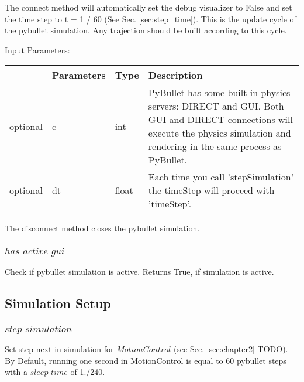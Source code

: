 \documentclass[
	ngerman,
	accentcolor=9c,%
	type=intern,
	marginpar=false
	]{tudapub}
\begin{document}
\vspace{0.5cm}

\noindent The connect method will automatically set the debug visualizer to False and set the time step to  t = 1 / 60 (See Sec. \ref{sec:step_time}). This is the update cycle of the pybullet simulation. Any trajection should be built according to this cycle. 


\vspace{0.5cm}
\noindent Input Parameters:
\vspace{0.5cm}


\begin{tabular}{|p{}|p{}|p{}| p{}|}
\hline
 & \textbf{Parameters} & \textbf{Type} & \textbf{Description} \\
\hline
optional & c & int &  PyBullet has some built-in physics servers: DIRECT and GUI. Both GUI and DIRECT connections will execute the physics simulation and rendering in the same process as PyBullet.
  \\
\hline
optional & dt & float &  Each time you call 'stepSimulation' the timeStep will proceed with 'timeStep'.  \\
\hline
\end{tabular}



\vspace{0.5cm}
\noindent The disconnect method closes the pybullet simulation. 


\vspace{0.5cm}


\subsubsection{$has\_active\_gui$}
\noindent Check if pybullet simulation is active. Returns True, if simulation is active.


\vspace{0.5cm}





\subsection{Simulation Setup}
\subsubsection{$step\_simulation$}
\noindent Set step next in simulation for $MotionControl$ (see Sec. \ref{sec:chapter2} TODO). By Default, running one second in MotionControl is equal to 60 pybullet steps with a $sleep\_time$ of 1./240.
\end{document}
